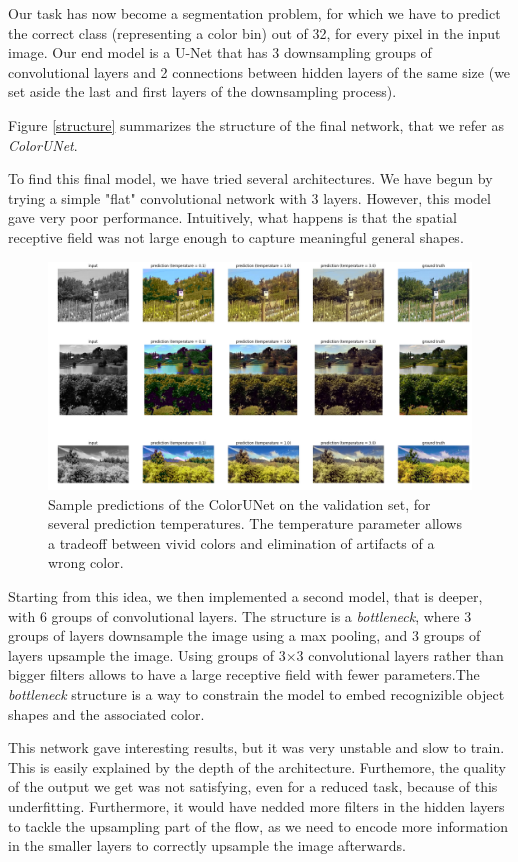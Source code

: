 \documentclass[10pt,twocolumn,letterpaper]{article}
\begin{document}
Our task has now become a segmentation problem, for which we have to predict the correct class (representing a color bin) out of 32, for every pixel in the input image. Our end model is a U-Net that has 3 downsampling groups of convolutional layers and 2 connections between hidden layers of the same size (we set aside the last and first layers of the downsampling process).

Figure \ref{structure} summarizes the structure of the final network, that we refer as \textit{ColorUNet}.

To find this final model, we have tried several architectures. We have begun by trying a simple "flat" convolutional network with 3 layers. However, this model gave very poor performance. Intuitively, what happens is that the spatial receptive field was not large enough to capture meaningful general shapes.
\begin{figure}
\begin{center}
\includegraphics[width=450px]{good}
\caption{Sample predictions of the ColorUNet on the validation set, for several prediction temperatures. The temperature parameter allows a tradeoff between vivid colors and elimination of artifacts of a wrong color.}
\label{good}
\end{center}
\end{figure}
Starting from this idea, we then implemented a second model, that is deeper, with 6 groups of convolutional layers. The structure is a \textit{bottleneck}, where 3 groups of layers downsample the image using a max pooling, and 3 groups of layers upsample the image. Using groups of 3$\times$3 convolutional layers rather than bigger filters allows to have a large receptive field with fewer parameters.The \textit{bottleneck} structure is a way to constrain the model to embed recognizible object shapes and the associated color. 

This network gave interesting results, but it was very unstable and slow to train. This is easily explained by the depth of the architecture. Furthemore, the quality of the output we get was not satisfying, even for a reduced task, because of this underfitting. Furthermore, it would have nedded more filters in the hidden layers to tackle the upsampling part of the flow, as we need to encode more information in the smaller layers to correctly upsample the image afterwards.
\end{document}
